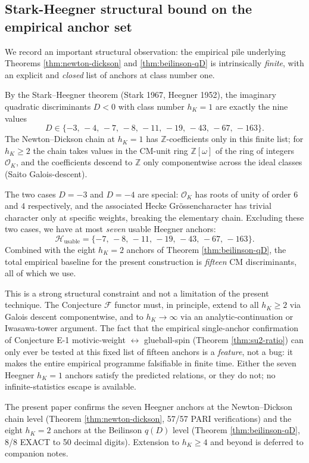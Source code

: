 \documentclass[11pt]{amsart}
\theoremstyle{definition}
\theoremstyle{remark}
\newcommand{\Z}{\mathbb{Z}}
\begin{document}
\subsection{Stark-Heegner structural bound on the empirical anchor
set}\label{ss:heegner-bound}

We record an important structural observation: the empirical pile
underlying Theorems \ref{thm:newton-dickson} and
\ref{thm:beilinson-qD} is intrinsically \emph{finite}, with an
explicit and \emph{closed} list of anchors at class number one.

By the Stark--Heegner theorem (Stark 1967, Heegner 1952), the
imaginary quadratic discriminants $D < 0$ with class number
$h_K = 1$ are exactly the nine values
\[
D \in \{-3,\,-4,\,-7,\,-8,\,-11,\,-19,\,-43,\,-67,\,-163\}.
\]
The Newton--Dickson chain at $h_K = 1$ has $\Z$-coefficients only
in this finite list; for $h_K \ge 2$ the chain takes values in the
CM-unit ring $\Z[\omega]$ of the ring of integers $\mathcal{O}_K$,
and the coefficients descend to $\Z$ only componentwise across the
ideal classes (Saito Galois-descent).

The two cases $D = -3$ and $D = -4$ are special: $\mathcal{O}_K$
has roots of unity of order $6$ and $4$ respectively, and the
associated Hecke Gr\"ossencharacter has trivial character only at
specific weights, breaking the elementary chain. Excluding these
two cases, we have at most \emph{seven} usable Heegner anchors:
\[
\mathcal{H}_{\mathrm{usable}} = \{-7,\,-8,\,-11,\,-19,\,-43,\,-67,\,-163\}.
\]
Combined with the eight $h_K = 2$ anchors of
Theorem \ref{thm:beilinson-qD}, the total empirical baseline for
the present construction is \emph{fifteen} CM discriminants, all
of which we use.

This is a strong structural constraint and not a limitation of
the present technique. The Conjecture $\mathcal{F}$ functor must,
in principle, extend to all $h_K \ge 2$ via Galois descent
componentwise, and to $h_K \to \infty$ via an analytic-continuation
or Iwasawa-tower argument. The fact that the empirical
single-anchor confirmation of Conjecture E-1 motivic-weight
$\leftrightarrow$ glueball-spin (Theorem \ref{thm:su2-ratio}) can
only ever be tested at this fixed list of fifteen anchors is a
\emph{feature}, not a bug: it makes the entire empirical
programme falsifiable in finite time. Either the seven Heegner
$h_K = 1$ anchors satisfy the predicted relations, or they do
not; no infinite-statistics escape is available.

The present paper confirms the seven Heegner anchors at the
Newton--Dickson chain level (Theorem \ref{thm:newton-dickson},
57/57 PARI verifications) and the eight $h_K = 2$ anchors at the
Beilinson $q(D)$ level (Theorem \ref{thm:beilinson-qD}, 8/8 EXACT
to 50 decimal digits). Extension to $h_K \ge 4$ and beyond is
deferred to companion notes.
\end{document}
